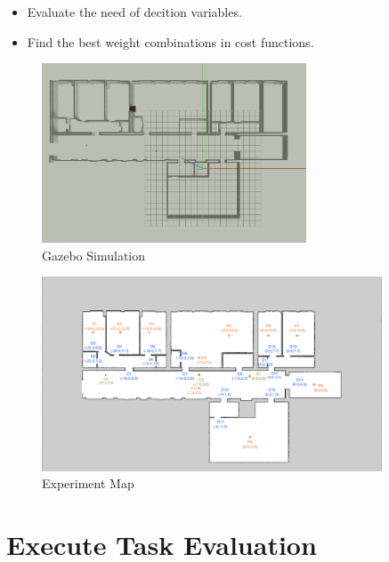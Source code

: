 \begin{itemize}
	\item Evaluate the need of decition variables.
	\item Find the best weight combinations in cost functions.
\end{itemize}

\begin{figure}[htbp]
	\centering
	\includegraphics[width = 0.7\textwidth]{content/images/ch5/gazebo_model.png}
	\caption{Gazebo Simulation}
	\label{fig:gazebo_model}
\end{figure}

\begin{figure}[htbp]
    \centering
    \includegraphics[width = 0.9\textwidth]{content/images/ch5/door_station_points.png}
    \caption{Experiment Map}
    \label{fig:exp_map}
\end{figure}

\section{Execute Task Evaluation}

